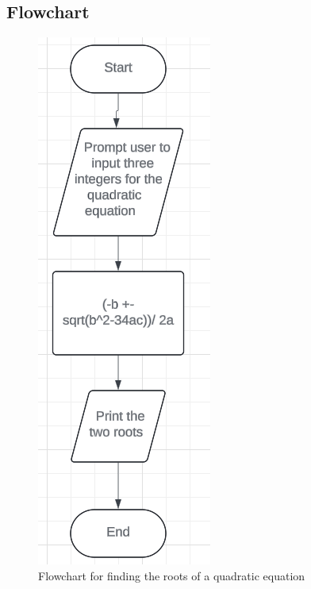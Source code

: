 \documentclass{article}
\begin{document}
\begin{flushleft}
  \section{Flowchart}
    \begin{figure}[!h]
      \begin{centering}
        \includegraphics[scale=0.5]{Q1.png}
        \caption{Flowchart for finding the roots of a quadratic equation}
      \end{centering}
    \end{figure}
    \newpage

\end{flushleft}
\end{document}
